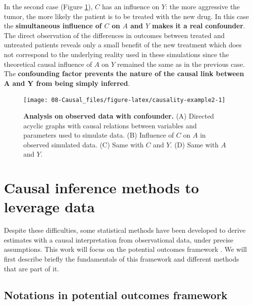 \documentclass[a4paper,12pt,twoside,onecolumn,openright,final,oldfontcommands]{memoir}
\begin{document}
In the second case (Figure \ref{fig:causality-example2}), \(C\) has an
influence on \(Y\): the more aggressive the tumor, the more likely the
patient is to be treated with the new drug. In this case the
\textbf{simultaneous influence of \(C\) on \(A\) and \(Y\) makes it a
real confounder}. The direct observation of the differences in outcomes
between treated and untreated patients reveals only a small benefit of
the new treatment which does not correspond to the underlying reality
used in these simulations since the theoretical causal influence of
\(A\) on \(Y\) remained the same as in the previous case. The
\textbf{confounding factor prevents the nature of the causal link
between A and Y from being simply inferred}.

\begin{figure}

{\centering \texttt{[image: 08-Causal\_files/figure-latex/causality-example2-1]} 

}

\caption[Analysis on observed data with confounder]{\textbf{Analysis on observed data with
confounder.} (A) Directed acyclic graphs with causal relations between
variables and parameters used to simulate data. (B) Influence of \(C\)
on \(A\) in observed simulated data. (C) Same with \(C\) and \(Y\). (D)
Same with \(A\) and \(Y\).}\label{fig:causality-example2}
\end{figure}







\section{Causal inference methods to leverage
data}\label{causal-inference-methods-to-leverage-data}

Despite these difficulties, some statistical methods have been developed
to derive estimates with a causal interpretation from observational
data, under precise assumptions. This work will focus on the potential
outcomes framework \citep{rubin1974estimating}. We will first describe
briefly the fundamentals of this framework and different methods that
are part of it.

\subsection{Notations in potential outcomes
framework}\label{notations-in-potential-outcomes-framework}
\end{document}
